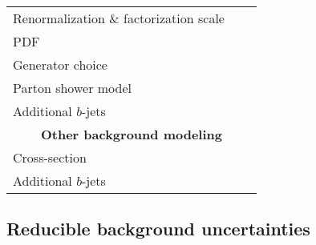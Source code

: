 \documentclass[../thesis.tex]{subfiles}
\begin{document}
\begin{table}[!ht]
\begin{center}
{\begin{tabular}{lcc}
      Renormalization \& factorization scale & & \\
      PDF & & \\
      Generator choice & & \\
      Parton shower model & & \\
      Additional $b$-jets & & \\
      \midrule
      \multicolumn{3}{c}{\textbf{Other background modeling}}  \\
      \midrule
      Cross-section & & \\
      Additional $b$-jets & & \\
      \bottomrule
    \end{tabular}}
  \end{center}
  \caption{} 
  \label{tab:syst_signal}
\end{table}

\subsection{Reducible background uncertainties}
\end{document}
